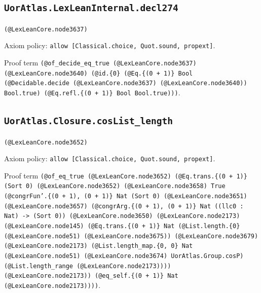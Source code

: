 \documentclass[11pt]{article}
\begin{document}
\subsection*{\texttt{UorAtlas.LexLeanInternal.decl274}}
\noindent\texttt{(@LexLeanCore.node3637)}\par
\noindent Axiom policy: \texttt{allow [Classical.choice, Quot.sound, propext]}.\par
\noindent Proof term \texttt{(@of\_decide\_eq\_true (@LexLeanCore.node3637) (@LexLeanCore.node3640) (@id.\{0\} (@Eq.\{(0 + 1)\} Bool (@Decidable.decide (@LexLeanCore.node3637) (@LexLeanCore.node3640)) Bool.true) (@Eq.refl.\{(0 + 1)\} Bool Bool.true)))}.\par
\subsection*{\texttt{UorAtlas.Closure.cosList\_length}}
\noindent\texttt{(@LexLeanCore.node3652)}\par
\noindent Axiom policy: \texttt{allow [Classical.choice, Quot.sound, propext]}.\par
\noindent Proof term \texttt{(@of\_eq\_true (@LexLeanCore.node3652) (@Eq.trans.\{(0 + 1)\} (Sort 0) (@LexLeanCore.node3652) (@LexLeanCore.node3658) True (@congrFun'.\{(0 + 1), (0 + 1)\} Nat (Sort 0) (@LexLeanCore.node3651) (@LexLeanCore.node3657) (@congrArg.\{(0 + 1), (0 + 1)\} Nat ((llc0 : Nat) -> (Sort 0)) (@LexLeanCore.node3650) (@LexLeanCore.node2173) (@LexLeanCore.node145) (@Eq.trans.\{(0 + 1)\} Nat (@List.length.\{0\} (@LexLeanCore.node51) (@LexLeanCore.node3675)) (@LexLeanCore.node3679) (@LexLeanCore.node2173) (@List.length\_map.\{0, 0\} Nat (@LexLeanCore.node51) (@LexLeanCore.node3674) UorAtlas.Group.cosP) (@List.length\_range (@LexLeanCore.node2173)))) (@LexLeanCore.node2173)) (@eq\_self.\{(0 + 1)\} Nat (@LexLeanCore.node2173))))}.\par
\end{document}
